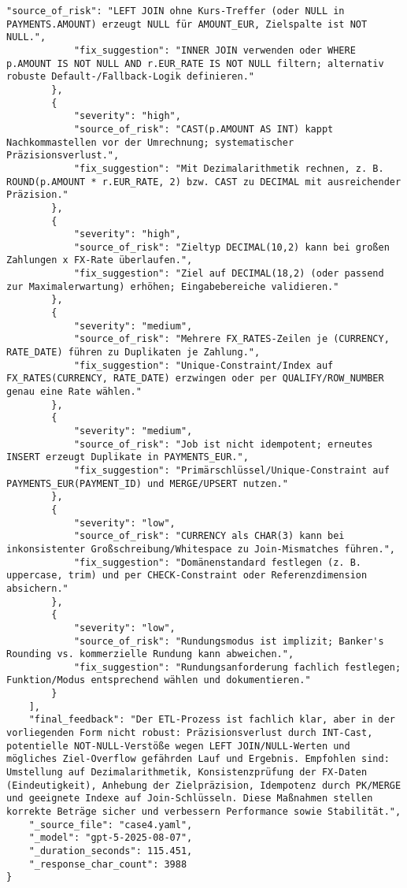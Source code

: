 \begin{lstlisting}[caption={Ausgabe: GPT-5 Anwendungsfall 4 Konsistenzdurchlauf},label={gpt_case4_prompt2}]
            "source_of_risk": "LEFT JOIN ohne Kurs-Treffer (oder NULL in PAYMENTS.AMOUNT) erzeugt NULL für AMOUNT_EUR, Zielspalte ist NOT NULL.",
            "fix_suggestion": "INNER JOIN verwenden oder WHERE p.AMOUNT IS NOT NULL AND r.EUR_RATE IS NOT NULL filtern; alternativ robuste Default-/Fallback-Logik definieren."
        },
        {
            "severity": "high",
            "source_of_risk": "CAST(p.AMOUNT AS INT) kappt Nachkommastellen vor der Umrechnung; systematischer Präzisionsverlust.",
            "fix_suggestion": "Mit Dezimalarithmetik rechnen, z. B. ROUND(p.AMOUNT * r.EUR_RATE, 2) bzw. CAST zu DECIMAL mit ausreichender Präzision."
        },
        {
            "severity": "high",
            "source_of_risk": "Zieltyp DECIMAL(10,2) kann bei großen Zahlungen x FX-Rate überlaufen.",
            "fix_suggestion": "Ziel auf DECIMAL(18,2) (oder passend zur Maximalerwartung) erhöhen; Eingabebereiche validieren."
        },
        {
            "severity": "medium",
            "source_of_risk": "Mehrere FX_RATES-Zeilen je (CURRENCY, RATE_DATE) führen zu Duplikaten je Zahlung.",
            "fix_suggestion": "Unique-Constraint/Index auf FX_RATES(CURRENCY, RATE_DATE) erzwingen oder per QUALIFY/ROW_NUMBER genau eine Rate wählen."
        },
        {
            "severity": "medium",
            "source_of_risk": "Job ist nicht idempotent; erneutes INSERT erzeugt Duplikate in PAYMENTS_EUR.",
            "fix_suggestion": "Primärschlüssel/Unique-Constraint auf PAYMENTS_EUR(PAYMENT_ID) und MERGE/UPSERT nutzen."
        },
        {
            "severity": "low",
            "source_of_risk": "CURRENCY als CHAR(3) kann bei inkonsistenter Großschreibung/Whitespace zu Join-Mismatches führen.",
            "fix_suggestion": "Domänenstandard festlegen (z. B. uppercase, trim) und per CHECK-Constraint oder Referenzdimension absichern."
        },
        {
            "severity": "low",
            "source_of_risk": "Rundungsmodus ist implizit; Banker's Rounding vs. kommerzielle Rundung kann abweichen.",
            "fix_suggestion": "Rundungsanforderung fachlich festlegen; Funktion/Modus entsprechend wählen und dokumentieren."
        }
    ],
    "final_feedback": "Der ETL-Prozess ist fachlich klar, aber in der vorliegenden Form nicht robust: Präzisionsverlust durch INT-Cast, potentielle NOT-NULL-Verstöße wegen LEFT JOIN/NULL-Werten und mögliches Ziel-Overflow gefährden Lauf und Ergebnis. Empfohlen sind: Umstellung auf Dezimalarithmetik, Konsistenzprüfung der FX-Daten (Eindeutigkeit), Anhebung der Zielpräzision, Idempotenz durch PK/MERGE und geeignete Indexe auf Join-Schlüsseln. Diese Maßnahmen stellen korrekte Beträge sicher und verbessern Performance sowie Stabilität.",
    "_source_file": "case4.yaml",
    "_model": "gpt-5-2025-08-07",
    "_duration_seconds": 115.451,
    "_response_char_count": 3988
}
\end{lstlisting}

